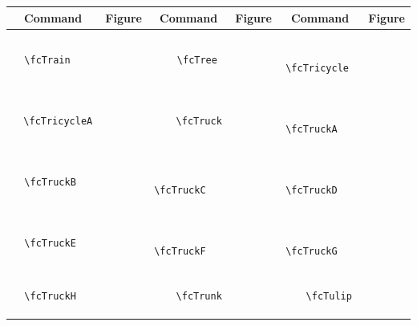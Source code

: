 \documentclass[x11names]{article}
\begin{document}
\begin{table}[H]\centering\begin{tabular}{|c|c|c|c|c|c|}\hline{\bf Command} & {\bf Figure} & {\bf Command} & {\bf Figure} & {\bf Command} & {\bf Figure}\\	\hline	&\multirow{5}{*}{	\fcTrain	[scale=0.64]} & &\multirow{5}{*}{	\fcTree	[scale=0.16]} & &\multirow{5}{*}{	\fcTricycle	[scale=0.16]}\\	& & & & & \\	& & & & & \\	\verb|	\fcTrain	| & & \verb|	\fcTree	| & & \verb|	\fcTricycle	| & \\	& & & & & \\	& & & & & \\	& & & & & \\	\hline									
		&\multirow{5}{*}{	\fcTricycleA	[scale=0.16]} & &\multirow{5}{*}{	\fcTruck	[scale=0.64]} & &\multirow{5}{*}{	\fcTruckA	[scale=0.16]}\\	& & & & & \\	& & & & & \\	\verb|	\fcTricycleA	| & & \verb|	\fcTruck	| & & \verb|	\fcTruckA	| & \\	& & & & & \\	& & & & & \\	& & & & & \\	\hline									
		&\multirow{5}{*}{	\fcTruckB	[scale=0.16]} & &\multirow{5}{*}{	\fcTruckC	[scale=0.16]} & &\multirow{5}{*}{	\fcTruckD	[scale=0.16]}\\	& & & & & \\	& & & & & \\	\verb|	\fcTruckB	| & & \verb|	\fcTruckC	| & & \verb|	\fcTruckD	| & \\	& & & & & \\	& & & & & \\	& & & & & \\	\hline									
		&\multirow{5}{*}{	\fcTruckE	[scale=0.16]} & &\multirow{5}{*}{	\fcTruckF	[scale=0.16]} & &\multirow{5}{*}{	\fcTruckG	[scale=0.16]}\\	& & & & & \\	& & & & & \\	\verb|	\fcTruckE	| & & \verb|	\fcTruckF	| & & \verb|	\fcTruckG	| & \\	& & & & & \\	& & & & & \\	& & & & & \\	\hline									
		&\multirow{5}{*}{	\fcTruckH	[scale=0.16]} & &\multirow{5}{*}{	\fcTrunk	[scale=0.64]} & &\multirow{5}{*}{	\fcTulip	[scale=0.16]}\\	& & & & & \\	& & & & & \\	\verb|	\fcTruckH	| & & \verb|	\fcTrunk	| & & \verb|	\fcTulip	| & \\	& & & & & \\	& & & & & \\	& & & & & \\	\hline									

\end{tabular}
\end{table}
\end{document}
